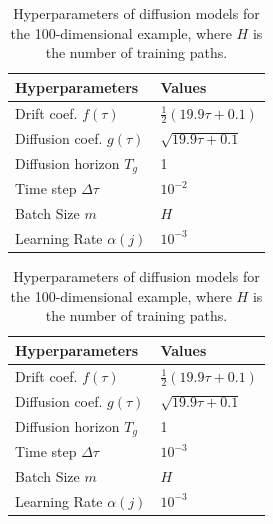 \documentclass[11pt]{article}
\begin{document}
\begin{table}[htp]
    \begin{minipage}{0.45\linewidth}
	\centering
	\begin{tabular}{l | l}
		\toprule Hyperparameters & Values\\
		\hline Drift coef. $f(\tau)$ & $\frac{1}{2}(19.9\tau + 0.1)$\\
		Diffusion coef. $g(\tau)$ & $\sqrt{19.9\tau + 0.1}$\\
        Diffusion horizon $T_g$ & 1\\
        Time step $\Delta\tau$& $10^{-2}$\\
        Batch Size $m$ & $H$\\
		Learning Rate $\alpha(j) $ & $10^{-3}$
        \\
        \bottomrule
	\end{tabular}
	\caption{Hyperparameters of diffusion models for the 1-dimensional examples, where $H$ is the number of training paths.}
	\label{table: DDPM_settings_1d}
	\end{minipage}%
    \hfill
    \begin{minipage}{0.45\linewidth}
	\centering
	\begin{tabular}{l | l}
		\toprule Hyperparameters & Values\\
		\hline Drift coef. $f(\tau)$ & $\frac{1}{2}(19.9\tau + 0.1)$\\
		Diffusion coef. $g(\tau)$ & $\sqrt{19.9\tau + 0.1}$\\
        Diffusion horizon $T_g$ & 1\\
        Time step $\Delta\tau$& $10^{-3}$\\
        Batch Size $m$ & $H$\\
		Learning Rate $\alpha(j) $ & $10^{-3}$
        \\
        \bottomrule
	\end{tabular}
	\caption{Hyperparameters of diffusion models for the 100-dimensional example, where $H$ is the number of training paths.}
	\label{table: DDPM_settings_100d}
	\end{minipage}%
\end{table}
\end{document}
